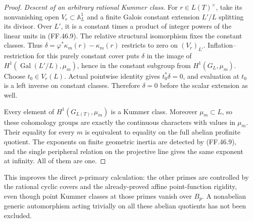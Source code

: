 \begin{proof}
\emph{Descent of an arbitrary rational Kummer class.}
For \(r\in L(T)^\times\), take its nonvanishing
open \(V_r\subset\mathbb A^1_L\) and a finite
Galois constant extension \(L'/L\) splitting its
divisor. Over \(L'\), it is a constant times a product
of integer powers of the linear units in (FF.46.9).
The relative structural isomorphism fixes the constant
classes. Thus
\(\delta=\varphi^*\kappa_m(r)-\kappa_m(r)\)
restricts to zero on \((V_r)_{L'}\).
Inflation--restriction for this purely constant cover
puts \(\delta\) in the image of
\(H^1(\operatorname{Gal}(L'/L),\mu_m)\), hence in
the constant subgroup from \(H^1(G_L,\mu_m)\).
Choose \(t_0\in V_r(L)\). Actual pointwise identity
gives \(t_0^*\delta=0\), and evaluation at \(t_0\)
is a left inverse on constant classes. Therefore
\(\delta=0\) before the scalar extension as well.

Every element of \(H^1(G_{L(T)},\mu_m)\) is a
Kummer class. Moreover \(\mu_m\subset L\), so
these cohomology groups are exactly the continuous
characters with values in \(\mu_m\). Their equality
for every \(m\) is equivalent to equality on the full
abelian profinite quotient. The exponents on finite
geometric inertia are detected by (FF.46.9), and the
single peripheral relation on the projective line gives
the same exponent at infinity. All of them are one.
\end{proof}

This improves the direct \(p\)-primary calculation:
the other primes are controlled by the rational cyclic
covers and the already-proved affine point-function
rigidity, even though point Kummer classes at those
primes vanish over \(B_p\). A nonabelian generic
automorphism acting trivially on all these abelian
quotients has not been excluded.
